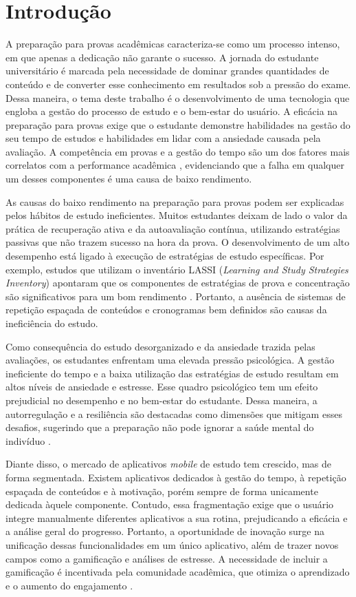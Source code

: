 \chapter{Introdução}
\label{cap:introducao}

A preparação para provas acadêmicas caracteriza-se como um processo intenso, em que apenas a dedicação não garante o sucesso.
A jornada do estudante universitário é marcada pela necessidade de dominar grandes quantidades de conteúdo e de converter esse conhecimento em resultados sob a pressão do exame.
Dessa maneira, o tema deste trabalho é o desenvolvimento de uma tecnologia que engloba a gestão do processo de estudo e o bem-estar do usuário.
A eficácia na preparação para provas exige que o estudante demonstre habilidades na gestão do seu tempo de estudos e habilidades em lidar com a ansiedade causada pela avaliação.
A competência em provas e a gestão do tempo são um dos fatores mais correlatos com a performance acadêmica \cite{kleijn_1994}, evidenciando que a falha em qualquer um desses componentes é uma causa de baixo rendimento.

As causas do baixo rendimento na preparação para provas podem ser explicadas pelos hábitos de estudo ineficientes.
Muitos estudantes deixam de lado o valor da prática de recuperação ativa e da autoavaliação contínua, utilizando estratégias passivas que não trazem sucesso na hora da prova.
O desenvolvimento de um alto desempenho está ligado à execução de estratégias de estudo específicas.
Por exemplo, estudos que utilizam o inventário LASSI (\textit{Learning and Study Strategies Inventory}) apontaram que os componentes de estratégias de prova e concentração são significativos para um bom rendimento \cite{zhou_2016}.
Portanto, a ausência de sistemas de repetição espaçada de conteúdos e cronogramas bem definidos são causas da ineficiência do estudo.

Como consequência do estudo desorganizado e da ansiedade trazida pelas avaliações, os estudantes enfrentam uma elevada pressão psicológica.
A gestão ineficiente do tempo e a baixa utilização das estratégias de estudo resultam em altos níveis de ansiedade e estresse.
Esse quadro psicológico tem um efeito prejudicial no desempenho e no bem-estar do estudante.
Dessa maneira, a autorregulação e a resiliência são destacadas como dimensões que mitigam esses desafios, sugerindo que a preparação não pode ignorar a saúde mental do indivíduo \cite{liu_2025}.

Diante disso, o mercado de aplicativos \textit{mobile} de estudo tem crescido, mas de forma segmentada.
Existem aplicativos dedicados à gestão do tempo, à repetição espaçada de conteúdos e à motivação, porém sempre de forma unicamente dedicada àquele componente.
Contudo, essa fragmentação exige que o usuário integre manualmente diferentes aplicativos a sua rotina, prejudicando a eficácia e a análise geral do progresso.
Portanto, a oportunidade de inovação surge na unificação dessas funcionalidades em um único aplicativo, além de trazer novos campos como a gamificação e análises de estresse.
A necessidade de incluir a gamificação é incentivada pela comunidade acadêmica, que otimiza o aprendizado e o aumento do engajamento \cite{marengo_2025}.

